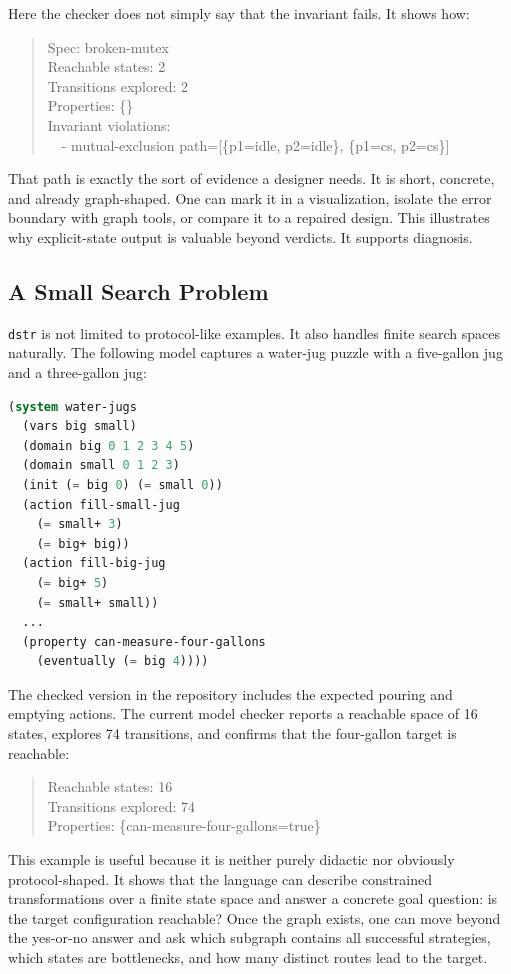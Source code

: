 \documentclass[11pt]{article}
\begin{document}
Here the checker does not simply say that the invariant fails. It shows how:

\begin{quote}
Spec: broken-mutex\\
Reachable states: 2\\
Transitions explored: 2\\
Properties: \{\}\\
Invariant violations:\\
\ \ - mutual-exclusion path=[\{p1=idle, p2=idle\}, \{p1=cs, p2=cs\}]
\end{quote}

That path is exactly the sort of evidence a designer needs. It is short,
concrete, and already graph-shaped. One can mark it in a visualization, isolate
the error boundary with graph tools, or compare it to a repaired design. This
illustrates why explicit-state output is valuable beyond verdicts. It supports
diagnosis.

\subsection{A Small Search Problem}

\texttt{dstr} is not limited to protocol-like examples. It also handles finite
search spaces naturally. The following model captures a water-jug puzzle with a
five-gallon jug and a three-gallon jug:

\begin{lstlisting}[language=Lisp]
(system water-jugs
  (vars big small)
  (domain big 0 1 2 3 4 5)
  (domain small 0 1 2 3)
  (init (= big 0) (= small 0))
  (action fill-small-jug
    (= small+ 3)
    (= big+ big))
  (action fill-big-jug
    (= big+ 5)
    (= small+ small))
  ...
  (property can-measure-four-gallons
    (eventually (= big 4))))
\end{lstlisting}

The checked version in the repository includes the expected pouring and emptying
actions. The current model checker reports a reachable space of 16 states,
explores 74 transitions, and confirms that the four-gallon target is reachable:

\begin{quote}
Reachable states: 16\\
Transitions explored: 74\\
Properties: \{can-measure-four-gallons=true\}
\end{quote}

This example is useful because it is neither purely didactic nor obviously
protocol-shaped. It shows that the language can describe constrained
transformations over a finite state space and answer a concrete goal question:
is the target configuration reachable? Once the graph exists, one can move
beyond the yes-or-no answer and ask which subgraph contains all successful
strategies, which states are bottlenecks, and how many distinct routes lead to
the target.
\end{document}
